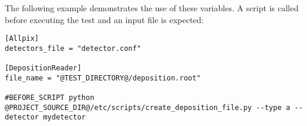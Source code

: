 The following example demonstrates the use of these variables.
A script is called before executing the test and an input file is expected:

\begin{verbatim}
[Allpix]
detectors_file = "detector.conf"

[DepositionReader]
file_name = "@TEST_DIRECTORY@/deposition.root"

#BEFORE_SCRIPT python @PROJECT_SOURCE_DIR@/etc/scripts/create_deposition_file.py --type a --detector mydetector
\end{verbatim}
